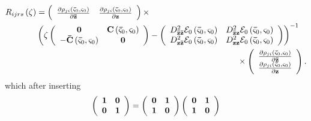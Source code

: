 \documentclass[aps,preprint]{revtex4}%
\begin{document}
\begin{align}
R_{ijrs}\left(  \zeta\right)   &  =\left(
\begin{array}
[c]{cc}%
\frac{\partial\rho_{ji}\left(  \mathbf{\bar{\varsigma}}_{0},\mathbf{\varsigma
}_{0}\right)  }{\partial\mathbf{\bar{z}}} & \frac{\partial\rho_{ji}\left(
\mathbf{\bar{\varsigma}}_{0},\mathbf{\varsigma}_{0}\right)  }{\partial
\mathbf{z}}%
\end{array}
\right)  \times\nonumber\\
&  \left(  \zeta\left(
\begin{array}
[c]{cc}%
\mathbf{0} & \mathbf{C}\left(  \mathbf{\bar{\varsigma}}_{0},\mathbf{\varsigma
}_{0}\right) \\
-\mathbf{\bar{C}}\left(  \mathbf{\bar{\varsigma}}_{0},\mathbf{\varsigma}%
_{0}\right)  & \mathbf{0}%
\end{array}
\right)  -\left(
\begin{array}
[c]{cc}%
D_{\mathbf{\bar{z}\bar{z}}}^{2}\mathcal{E}_{0}\left(  \mathbf{\bar{\varsigma}%
}_{0},\mathbf{\varsigma}_{0}\right)  & D_{\mathbf{\bar{z}z}}^{2}%
\mathcal{E}_{0}\left(  \mathbf{\bar{\varsigma}}_{0},\mathbf{\varsigma}%
_{0}\right) \\
D_{\mathbf{z\bar{z}}}^{2}\mathcal{E}_{0}\left(  \mathbf{\bar{\varsigma}}%
_{0},\mathbf{\varsigma}_{0}\right)  & D_{\mathbf{zz}}^{2}\mathcal{E}%
_{0}\left(  \mathbf{\bar{\varsigma}}_{0},\mathbf{\varsigma}_{0}\right)
\end{array}
\right)  \right)  ^{-1}\nonumber\\
&  \qquad\qquad\qquad\qquad\qquad\qquad\qquad\qquad\qquad\qquad\qquad
\qquad\times\left(
\begin{array}
[c]{c}%
\frac{\partial\rho_{ji}\left(  \mathbf{\bar{\varsigma}}_{0},\mathbf{\varsigma
}_{0}\right)  }{\partial\mathbf{\bar{z}}}\\
\frac{\partial\rho_{ji}\left(  \mathbf{\bar{\varsigma}}_{0},\mathbf{\varsigma
}_{0}\right)  }{\partial\mathbf{z}}%
\end{array}
\right)  . \label{LinPhaseRes}%
\end{align}
which after inserting
\begin{equation}
\left(
\begin{array}
[c]{cc}%
\mathbf{1} & \mathbf{0}\\
\mathbf{0} & \mathbf{1}%
\end{array}
\right)  =\left(
\begin{array}
[c]{cc}%
\mathbf{0} & \mathbf{1}\\
\mathbf{1} & \mathbf{0}%
\end{array}
\right)  \left(
\begin{array}
[c]{cc}%
\mathbf{0} & \mathbf{1}\\
\mathbf{1} & \mathbf{0}%
\end{array}
\right)
\end{equation}
\end{document}
